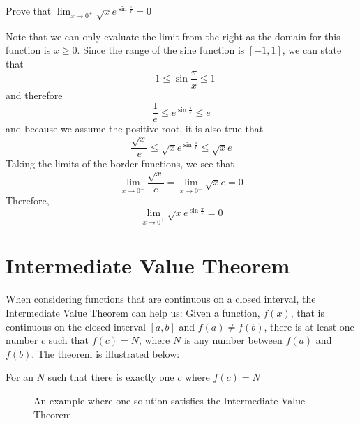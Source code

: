 \begin{Exercise}
    [title= Squeeze Theorem 3, label=squeeze3]
    Prove that $\lim_{x \to 0^+}\sqrt{x}e^{\sin{\frac{\pi}{x}}} = 0$
    \vspace{40mm}
\end{Exercise}

\begin{Answer}
    [ref=squeeze3]
    Note that we can only evaluate the limit from the right as the domain for this 
    function is $x \geq 0$. Since the range of the sine function is $[-1,1]$, we 
    can state that $$-1 \leq \sin{\frac{\pi}{x}} \leq 1$$ 
    and therefore $$\frac{1}{e} \leq e^{\sin{\frac{\pi}{x}}} \leq e$$ and because 
    we assume the positive root, it is also true that $$\frac{\sqrt{x}}{e} \leq 
    \sqrt{x}e^{\sin{\frac{\pi}{x}}} \leq \sqrt{x}e$$ Taking the limits of the 
    border functions, we see that $$\lim_{x \to 0^+}\frac{\sqrt{x}}{e} = \lim_{x 
    \to 0^+}\sqrt{x}e = 0$$ Therefore, $$\lim_{x \to 0^+}\sqrt{x}e^{\sin{\frac{\pi}
    {x}}}=0$$
\end{Answer}


\section{Intermediate Value Theorem}
When considering functions that are continuous on a closed interval, the 
Intermediate Value Theorem can help us: Given a function, $f(x)$, that is 
continuous on the closed interval $\left[a, b\right]$ and $f(a) \neq f(b)$, there 
is at least one number $c$ such that $f(c) = N$, where $N$ is any number between 
$f(a)$ and $f(b)$. The theorem is illustrated below:

For an $N$ such that there is exactly one $c$ where $f(c) = N$

\begin{figure}[hbtp]
\centering
{}
\caption{An example where one solution satisfies the Intermediate Value Theorem}
\end{figure}

